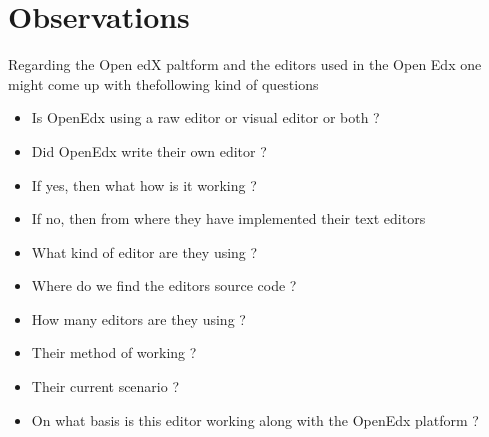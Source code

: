\section{Observations}
Regarding the Open edX paltform and the editors used in the Open Edx one might come up with thefollowing kind of questions
\begin{itemize}
\item Is OpenEdx using a raw editor or visual editor or both ?
\item Did OpenEdx write their own editor ?
\item If yes, then what how is it working ?
\item If no, then from where they have implemented their text editors
\item What kind of editor are they using ?
\item Where do we find the editors source code ?
\item How many editors are they using ?
\item Their method of working ?
\item Their current scenario ?
\item On what basis is this editor working along with the OpenEdx platform ?\newline\newline
\end{itemize}


